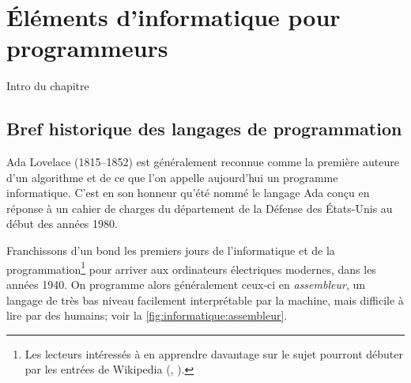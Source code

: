 
\chapter{Éléments d'informatique pour programmeurs}
\label{chap:informatique}

Intro du chapitre

\section{Bref historique des langages de programmation}
\label{sec:informatique:historique}

Ada Lovelace (1815--1852) est généralement reconnue comme la première
auteure d'un algorithme et de ce que l'on appelle aujourd'hui un
programme informatique. C'est en son honneur qu'été nommé le langage
Ada conçu en réponse à un cahier de charges du département de la
Défense des États-Unis au début des années 1980.

Franchissons d'un bond les premiers jours de l'informatique et de la
programmation\footnote{%
  Les lecteurs intéressés à en apprendre davantage sur le sujet
  pourront débuter par les entrées de Wikipedia
  (,
  ).} %
pour arriver aux ordinateurs électriques modernes, dans les années
1940. On programme alors généralement ceux-ci en \emph{assembleur}, un
langage de très bas niveau facilement interprétable par la machine,
mais difficile à lire par des humains; voir la
\autoref{fig:informatique:assembleur}.


